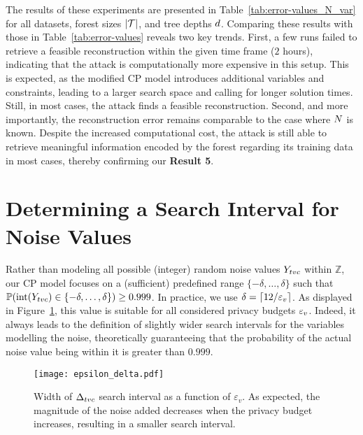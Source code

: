 The results of these experiments are presented in Table~\ref{tab:error-values_N_var} for all datasets, forest sizes $\lvert \mathcal{T} \rvert$, and tree depths $d$. Comparing these results with those in Table~\ref{tab:error-values} reveals two key trends. First, a few runs failed to retrieve a feasible reconstruction within the given time frame ($2$ hours), indicating that the attack is computationally more expensive in this setup. 
This is expected, as the modified CP model introduces additional variables and constraints, leading to a larger search space and calling for longer solution times. Still, in most cases, the attack finds a feasible reconstruction. 
Second, and more importantly, the reconstruction error remains comparable to the case where $N$ is known. Despite the increased computational cost, the attack is still able to retrieve meaningful information encoded by the forest regarding its training data in most cases, thereby confirming our \textbf{Result 5}.



\clearpage 

\section{Determining a Search Interval for Noise Values}\label{appendix:width_delta_search_interval}

Rather than modeling all possible (integer) random noise values $Y_{tvc}$ within $\mathbb{Z}$, our CP model focuses on a (sufficient) predefined range $\{ -\delta,\dots, \delta \}$ such that $\mathbb{P}(\textrm{int}(Y_{tvc}) \in \{ -\delta,\dots, \delta \} ) \geq 0.999$. In practice, we use $\delta = \lceil 12 / \varepsilon_v \rceil$. 
As displayed in Figure~\ref{intervalle_recherche}, this value is suitable for all considered privacy budgets $\varepsilon_v$. Indeed, it always leads to the definition of slightly wider search intervals for the variables modelling the noise, theoretically guaranteeing that the probability of the actual noise value being within it is greater than $0.999$.

\begin{figure}[htbp]
    \vskip 0.2in
    \begin{center}
    \centerline{\texttt{[image: epsilon\_delta.pdf]}}
    \caption{Width of $\Delta_{tvc }$ search interval as a function of $\varepsilon_v$. 
    As expected, the magnitude of the noise added decreases when the privacy budget increases, resulting in a smaller search interval.}
    \label{intervalle_recherche}
    \end{center}
    \vskip -0.2in
\end{figure}


